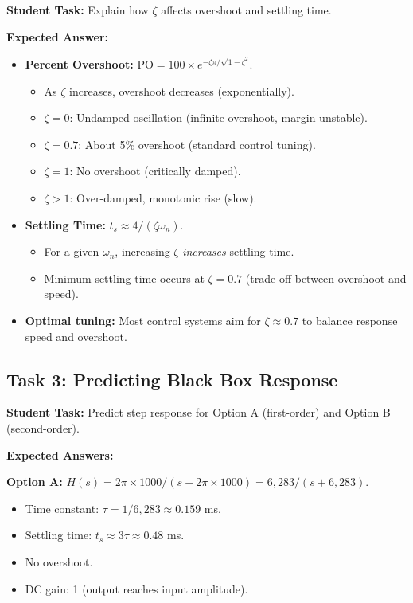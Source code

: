 \documentclass[11pt,letterpaper]{article}
\begin{document}
\textbf{Student Task:} Explain how $\zeta$ affects overshoot and settling time.

\noindent
\textbf{Expected Answer:}

\begin{itemize}
    \item \textbf{Percent Overshoot:} $\text{PO} = 100 \times e^{-\zeta \pi / \sqrt{1-\zeta^2}}$.
        \begin{itemize}
            \item As $\zeta$ increases, overshoot decreases (exponentially).
            \item $\zeta = 0$: Undamped oscillation (infinite overshoot, margin unstable).
            \item $\zeta = 0.7$: About 5\% overshoot (standard control tuning).
            \item $\zeta = 1$: No overshoot (critically damped).
            \item $\zeta > 1$: Over-damped, monotonic rise (slow).
        \end{itemize}

    \item \textbf{Settling Time:} $t_s \approx 4 / (\zeta \omega_n)$.
        \begin{itemize}
            \item For a given $\omega_n$, increasing $\zeta$ \textit{increases} settling time.
            \item Minimum settling time occurs at $\zeta = 0.7$ (trade-off between overshoot and speed).
        \end{itemize}

    \item \textbf{Optimal tuning:} Most control systems aim for $\zeta \approx 0.7$ to balance response speed and overshoot.
\end{itemize}

\subsection{Task 3: Predicting Black Box Response}

\textbf{Student Task:} Predict step response for Option A (first-order) and Option B (second-order).

\noindent
\textbf{Expected Answers:}

\noindent
\textbf{Option A:} $H(s) = 2\pi \times 1000 / (s + 2\pi \times 1000) = 6,283 / (s + 6,283)$.

\begin{itemize}
    \item Time constant: $\tau = 1 / 6,283 \approx 0.159$ ms.
    \item Settling time: $t_s \approx 3\tau \approx 0.48$ ms.
    \item No overshoot.
    \item DC gain: 1 (output reaches input amplitude).
\end{itemize}
\end{document}
